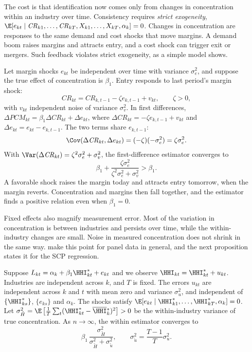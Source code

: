 The cost is that identification now comes only from changes in concentration within an industry over
time. Consistency requires \emph{strict exogeneity}, $\E[e_{kt} \mid \mathit{CR}_{k1}, \dots,
\mathit{CR}_{kT}, X_{k1}, \dots, X_{kT}, \alpha_k] = 0$. Changes in concentration are responses to the
same demand and cost shocks that move margins. A demand boom raises margins and attracts entry, and a
cost shock can trigger exit or mergers. Such feedback violates strict exogeneity, as a simple model
shows.

\begin{example}\label{ex:01-feedback}
Let margin shocks $e_{kt}$ be independent over time with variance $\sigma_e^2$, and suppose the true
effect of concentration is $\beta_1$. Entry responds to last period's margin shock:
\[
\mathit{CR}_{kt} = \mathit{CR}_{k,t-1} - \zeta e_{k,t-1} + v_{kt}, \qquad \zeta > 0,
\]
with $v_{kt}$ independent noise of variance $\sigma_v^2$. In first differences, $\Delta \mathit{PCM}_{kt}
= \beta_1 \Delta \mathit{CR}_{kt} + \Delta e_{kt}$, where $\Delta \mathit{CR}_{kt} = -\zeta e_{k,t-1} +
v_{kt}$ and $\Delta e_{kt} = e_{kt} - e_{k,t-1}$. The two terms share $e_{k,t-1}$:
\[
\Cov(\Delta \mathit{CR}_{kt}, \Delta e_{kt}) = (-\zeta)(-\sigma_e^2) = \zeta \sigma_e^2 .
\]
With $\Var(\Delta \mathit{CR}_{kt}) = \zeta^2 \sigma_e^2 + \sigma_v^2$, the first-difference estimator
converges to
\[
\beta_1 + \frac{\zeta \sigma_e^2}{\zeta^2 \sigma_e^2 + \sigma_v^2} > \beta_1 .
\]
A favorable shock raises the margin today and attracts entry tomorrow, when the margin reverts.
Concentration and margins then fall together, and the estimator finds a positive relation even when
$\beta_1 = 0$.
\end{example}

Fixed effects also magnify measurement error. Most of the variation in concentration is between
industries and persists over time, while the within-industry changes are small. Noise in measured
concentration does not shrink in the same way. \citet{GrilichesHausman1986} make this point for panel
data in general, and the next proposition states it for the SCP regression.

\begin{proposition}\label{prop:01-fe-attenuation}
Suppose $L_{kt} = \alpha_k + \beta_1 \HHI^*_{kt} + e_{kt}$ and we observe $\HHI_{kt} = \HHI^*_{kt} +
u_{kt}$. Industries are independent across $k$, and $T$ is fixed. The errors $u_{kt}$ are independent
across $k$ and $t$ with mean zero and variance $\sigma_u^2$, and independent of $\{\HHI^*_{ks}\}$,
$\{e_{ks}\}$ and $\alpha_k$. The shocks satisfy $\E[e_{kt} \mid \HHI^*_{k1}, \dots, \HHI^*_{kT}, \alpha_k] =
0$. Let $\sigma^2_{\tilde H} = \E\left[\frac{1}{T}\sum_t (\HHI^*_{kt} - \overline{\HHI}{}^*_k)^2\right] >
0$ be the within-industry variance of true concentration. As $n \to \infty$, the within estimator
converges to
\[
\beta_1 \, \frac{\sigma^2_{\tilde H}}{\sigma^2_{\tilde H} + \sigma^2_{\tilde u}}, \qquad
\sigma^2_{\tilde u} = \frac{T - 1}{T} \sigma_u^2 .
\]
\end{proposition}

